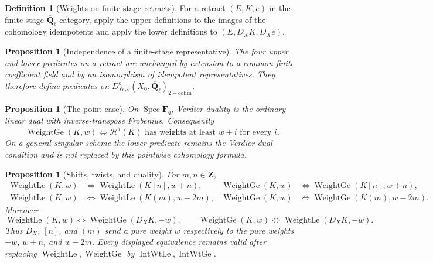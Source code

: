 \documentclass[10pt]{article}
\newtheorem{proposition}[theorem]{Proposition}
\theoremstyle{definition}
\newtheorem{definition}[theorem]{Definition}
\newcommand{\Fq}{\mathbf F_q}
\newcommand{\Qlb}{\overline{\mathbf Q}_\ell}
\newcommand{\WeilD}{D^b_{\mathrm W,c}}
\newcommand{\WtLe}{\operatorname{WeightLe}}
\newcommand{\WtGe}{\operatorname{WeightGe}}
\newcommand{\Spec}{\operatorname{Spec}}
\begin{document}
\begin{definition}[Weights on finite-stage retracts]
For a retract \((E,K,e)\) in the finite-stage \(\Qlb\)-category, apply the
upper definitions to the images of the cohomology idempotents and apply the
lower definitions to \((E,D_XK,D_Xe)\).
\end{definition}

\begin{proposition}[Independence of a finite-stage representative]
The four upper and lower predicates on a retract are unchanged by extension
to a common finite coefficient field and by an isomorphism of idempotent
representatives.  They therefore define predicates on
\(\WeilD(X_0,\Qlb)_{\mathrm{2-colim}}\).
\end{proposition}

\begin{proposition}[The point case]
On \(\Spec\Fq\), Verdier duality is the ordinary linear dual with
inverse-transpose Frobenius.  Consequently
\[
 \WtGe(K,w)
 \Longleftrightarrow
 \mathcal H^i(K)\text{ has weights at least }w+i
 \text{ for every }i.
\]
On a general singular scheme the lower predicate remains the Verdier-dual
condition and is not replaced by this pointwise cohomology formula.
\end{proposition}

\begin{proposition}[Shifts, twists, and duality]
For \(m,n\in\mathbf Z\),
\[
\begin{aligned}
 \WtLe(K,w)&\Longleftrightarrow\WtLe(K[n],w+n),&
 \WtGe(K,w)&\Longleftrightarrow\WtGe(K[n],w+n),\\
 \WtLe(K,w)&\Longleftrightarrow\WtLe(K(m),w-2m),&
 \WtGe(K,w)&\Longleftrightarrow\WtGe(K(m),w-2m).
\end{aligned}
\]
Moreover
\[
 \WtLe(K,w)\Longleftrightarrow\WtGe(D_XK,-w),
 \qquad
 \WtGe(K,w)\Longleftrightarrow\WtLe(D_XK,-w).
\]
Thus \(D_X\), \([n]\), and \((m)\) send a pure weight \(w\) respectively
to the pure weights \(-w\), \(w+n\), and \(w-2m\).
Every displayed equivalence remains valid after replacing
\(\WtLe,\WtGe\) by \(\operatorname{IntWtLe},\operatorname{IntWtGe}\).
\end{proposition}
\end{document}
